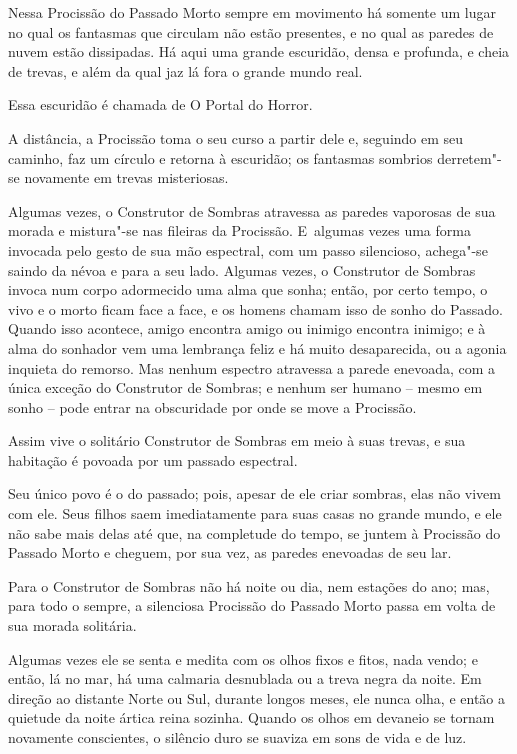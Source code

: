 Nessa Procissão do Passado Morto sempre em movimento há somente um lugar
no qual os fantasmas que circulam não estão presentes, e no qual as
paredes de nuvem estão dissipadas. Há aqui uma grande escuridão, densa e
profunda, e cheia de trevas, e além da qual jaz lá fora o grande mundo
real.

Essa escuridão é chamada de O Portal do Horror.

A distância, a Procissão toma o seu curso a partir dele e, seguindo em
seu caminho, faz um círculo e retorna à escuridão; os fantasmas sombrios
derretem"-se novamente em trevas misteriosas.

Algumas vezes, o Construtor de Sombras atravessa as paredes vaporosas de
sua morada e mistura"-se nas fileiras da Procissão. E~algumas vezes uma
forma invocada pelo gesto de sua mão espectral, com um passo silencioso,
achega"-se saindo da névoa e para a seu lado. Algumas vezes, o
Construtor de Sombras invoca num corpo adormecido uma alma que sonha;
então, por certo tempo, o vivo e o morto ficam face a face, e os homens
chamam isso de sonho do Passado. Quando isso acontece, amigo encontra
amigo ou inimigo encontra inimigo; e à alma do sonhador vem uma
lembrança feliz e há muito desaparecida, ou a agonia inquieta do
remorso. Mas nenhum espectro atravessa a parede enevoada, com a única
exceção do Construtor de Sombras; e nenhum ser humano -- mesmo em sonho
-- pode entrar na obscuridade por onde se move a Procissão.

Assim vive o solitário Construtor de Sombras em meio à suas trevas, e sua
habitação é povoada por um passado espectral.

Seu único povo é o do passado; pois, apesar de ele criar sombras, elas
não vivem com ele. Seus filhos saem imediatamente para suas casas no
grande mundo, e ele não sabe mais delas até que, na completude do tempo,
se juntem à Procissão do Passado Morto e cheguem, por sua vez,
as paredes enevoadas de seu lar.



Para o Construtor de Sombras não há noite ou dia, nem estações do ano;
mas, para todo o sempre, a silenciosa Procissão do Passado Morto passa
em volta de sua morada solitária.

Algumas vezes ele se senta e medita com os olhos fixos e fitos, nada
vendo; e então, lá no mar, há uma calmaria desnublada ou a treva negra
da noite. Em direção ao distante Norte ou Sul, durante longos meses, ele
nunca olha, e então a quietude da noite ártica reina sozinha. Quando os
olhos em devaneio se tornam novamente conscientes, o silêncio duro se
suaviza em sons de vida e de luz.

